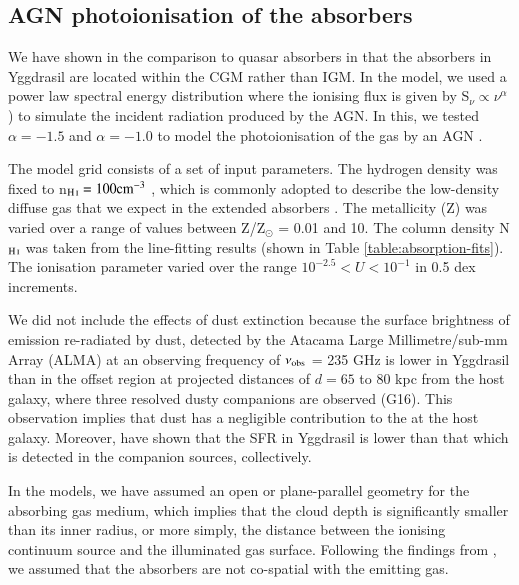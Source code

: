 \subsection{AGN photoionisation of the absorbers}\label{section:photoionisation-absorbers}

We have shown in the comparison to quasar absorbers in \citet{fechner2009} that the absorbers in Yggdrasil are located within the CGM rather than IGM. In the  model, we used a power law spectral energy distribution  where the ionising flux is given by S$_\nu \propto \nu^\alpha$) to simulate the incident radiation produced by the AGN. In this, we tested $\alpha=-1.5$ and $\alpha=-1.0$ to model the photoionisation of the gas by an AGN \citep[e.g.][]{villar-martin1997,feltre2016,humphrey2018}.

The model grid consists of a set of input parameters. The hydrogen density was fixed to n$_\ion{H}{I} = 100 {\rm cm}^{-3}$ , which is commonly adopted to describe the low-density diffuse gas that we expect in the extended absorbers \citep[e.g.][]{binette2000,humphrey2008a}. The metallicity (Z) was varied over a range of values between Z/Z$_\odot$ = 0.01 and 10. The  column density N$_\ion{H}{I}$ was taken from the line-fitting results (shown in Table \ref{table:absorption-fits}). The ionisation parameter varied over the range $ 10^{-2.5} < U < 10^{-1}$ in 0.5 dex increments.

We did not include the effects of dust extinction because the surface brightness of emission re-radiated by dust, detected by the Atacama Large Millimetre/sub-mm Array (ALMA) at an observing frequency of $\nu_{\rm obs}$ = 235 GHz is lower in Yggdrasil than in the offset region at projected distances of $d = 65$ to 80 kpc from the host galaxy, where three resolved dusty companions are observed (G16). This observation implies that dust has a negligible contribution to the  at the host galaxy. Moreover, \citet{falkendal2019} have shown that the SFR in Yggdrasil is lower than that which is detected in the companion sources, collectively. 

In the  models, we have assumed an open or plane-parallel geometry for the absorbing gas medium, which implies that the cloud depth is significantly smaller than its inner radius, or more simply, the distance between the ionising continuum source and the illuminated gas surface. Following the findings from \citet{binette2000}, we assumed that the absorbers are not co-spatial with the emitting gas. 

